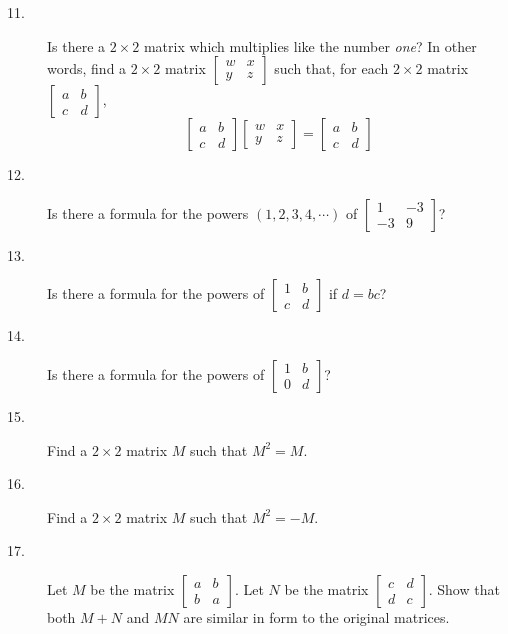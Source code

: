 \documentclass{article}
\begin{document}
\begin{description}
  \item[11.] Is there a $2 \times 2$ matrix which multiplies like the number \emph{one}? In other words, find a $2 \times 2$ matrix $\begin{bmatrix} w & x \\ y & z \end{bmatrix}$ such that, for each $2 \times 2$ matrix $\begin{bmatrix} a & b \\ c & d \end{bmatrix}$,
    \begin{equation*}
    \begin{bmatrix} a & b \\ c & d \end{bmatrix}  \begin{bmatrix} w & x \\ y & z \end{bmatrix}  =  \begin{bmatrix} a & b \\ c & d \end{bmatrix}
    \end{equation*}

  \item[12.] Is there a formula for the powers $(1, 2, 3, 4, \cdots)$ of $\begin{bmatrix} 1 & -3 \\ -3 & 9 \end{bmatrix}$? 

  \item[13.] Is there a formula for the powers of $\begin{bmatrix} 1 & b \\ c & d \end{bmatrix}$ if $d = bc$?

  \item[14.] Is there a formula for the powers of $\begin{bmatrix} 1 & b \\ 0 & d \end{bmatrix}$? 

  \item[15.] Find a $2 \times 2$ matrix $M$ such that $M^2 = M$. 

  \item[16.] Find a $2 \times 2$ matrix $M$ such that $M^2 = -M$. 

  \item[17.] Let $M$ be the matrix $\begin{bmatrix} a & b \\ b & a \end{bmatrix}$. Let $N$ be the matrix $\begin{bmatrix} c & d \\ d & c \end{bmatrix}$. Show that both $M+N$ and $MN$ are similar in form to the original matrices.


\end{description}
\end{document}
